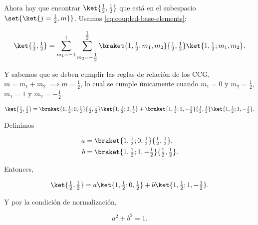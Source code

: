 \documentclass[./../main.tex]{subfiles}
\begin{document}
\begin{exercise}
\begin{enumerate}[label=(\alph*)]
\begin{solution}
                Ahora hay que encontrar \(\ket{\frac{1}{2}, \frac{1}{2}}\) que está en el subespacio \(\set{\ket{j = \frac{1}{2}, m}}\). Usamos \cref{eq:coupled-base-elements}:

                \begin{equation}
                    \ket{\tfrac{1}{2}, \tfrac{1}{2}} = \sum_{m_{1} = -1}^{1}\sum_{m_{2} = -\tfrac{1}{2}}^{\tfrac{1}{2}}\braket{1, \tfrac{1}{2}; m_{1}, m_{2}}{\tfrac{1}{2}, \tfrac{1}{2}}\ket{1, \tfrac{1}{2}; m_{1}, m_{2}}.
                    \label{eq:coupled-elements-2nd-subspace}
                \end{equation}

                Y sabemos que se deben cumplir las reglas de relación de los CCG, \(m = m_{1} + m_{2}\ \implies m = \frac{1}{2}\), lo cual se cumple únicamente cuando \(m_{1} = 0\) y \(m_{2} = \frac{1}{2}\), \(m_{1} = 1\) y \(m_{2} = -\frac{1}{2}\).

                \begin{equation*}
                    \ket{\tfrac{1}{2}, \tfrac{1}{2}} = \braket{1, \tfrac{1}{2}; 0, \tfrac{1}{2}}{\tfrac{1}{2}, \tfrac{1}{2}}\ket{1, \tfrac{1}{2}; 0, \tfrac{1}{2}} + \braket{1, \tfrac{1}{2}; 1, -\tfrac{1}{2}}{\tfrac{1}{2}, \tfrac{1}{2}}\ket{1, \tfrac{1}{2}; 1, -\tfrac{1}{2}}.
                \end{equation*}

                Definimos
                
                \begin{align*}
                    a &= \braket{1, \tfrac{1}{2}; 0, \tfrac{1}{2}}{\tfrac{1}{2}, \tfrac{1}{2}},\\
                    b &= \braket{1, \tfrac{1}{2}; 1, -\tfrac{1}{2}}{\tfrac{1}{2}, \tfrac{1}{2}}.
                \end{align*}

                Entonces,

                \begin{equation}
                    \ket{\tfrac{1}{2}, \tfrac{1}{2}} = a\ket{1, \tfrac{1}{2}; 0, \tfrac{1}{2}} + b\ket{1, \tfrac{1}{2}; 1, -\tfrac{1}{2}}.
                    \label{eq:1212-substitute-CCG}
                \end{equation}

                Y por la condición de normalización,

                \begin{equation}
                    a^{2} + b^{2} = 1.
                    \label{eq:normalization-condition-1212-CCG}
                \end{equation}


\end{solution}
\end{enumerate}
\end{exercise}
\end{document}
